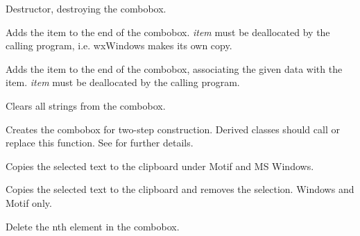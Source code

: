 
Destructor, destroying the combobox.



Adds the item to the end of the combobox. {\it item} must be deallocated by the calling
program, i.e. wxWindows makes its own copy.


Adds the item to the end of the combobox, associating the given data
with the item. {\it item} must be deallocated by the calling program.



Clears all strings from the combobox.



Creates the combobox for two-step construction. Derived classes
should call or replace this function. See \rtfsp
for further details.



Copies the selected text to the clipboard under Motif and MS Windows.



Copies the selected text to the clipboard and removes the selection. Windows and Motif only.



Delete the nth element in the combobox.


